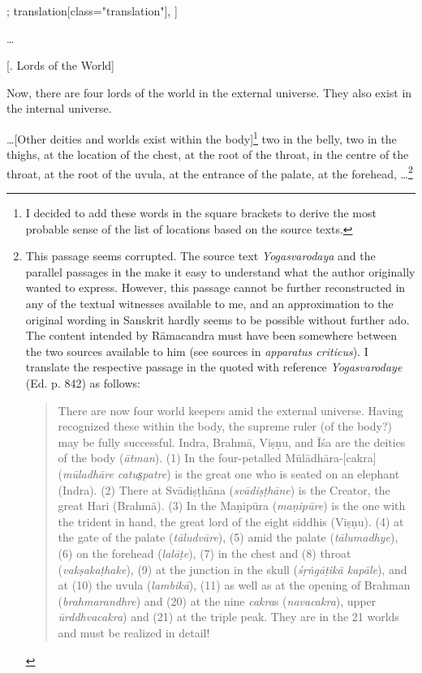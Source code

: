 \begin{alignment}[
  texts=edition[class="edition"];
  translation[class="translation"],
  ]
\begin{edition}
\begin{prose}
{  }\dd{}
\dd{}\begin{otherlanguage}{english} \ldots \sic*{} \end{otherlanguage}
    \end{prose}
  \end{edition}
  \begin{translation}
    \begin{tlate}
      \centerline{\textrm{\small{[. Lords of the World]}}}
      \bigskip
      \noindent

     Now, there are four lords of the world in the external universe. They also exist in the internal universe.

\sic*{} \ldots  [Other deities and worlds exist within the body]\footnote{I decided to add these words in the square brackets to derive the most probable sense of the list of locations based on the source texts.} two in the belly, two in the thighs, at the location of the chest, at the root of the throat, in the centre of the throat, at the root of the uvula, at the entrance of the palate, at the forehead, \ldots \sic*{}\footnote{This passage seems corrupted. The source text \textit{Yogasvarodaya} and the parallel passages in the  make it easy to understand what the author originally wanted to express. However, this passage cannot be further reconstructed in any of the textual witnesses available to me, and an approximation to the original wording in Sanskrit hardly seems to be possible without further ado. The content intended by Rāmacandra must have been somewhere between the two sources available to him (see sources in \textit{apparatus criticus}). I translate the respective passage in the  quoted with reference \textit{Yogasvarodaye} (Ed. p. 842) as follows:
  \begin{quote}
  There are now four world keepers amid the external universe. Having recognized these within the body, the supreme ruler (of the body?) may be fully successful. Indra, Brahmā, Viṣṇu, and Īśa are the deities of the body (\textit{ātman}). (1) In the four-petalled Mūlādhāra-[cakra] (\textit{mūladhāre catus̤patre}) is the great one who is seated on an elephant (Indra). (2) There at Svādiṣṭhāna (\textit{svādiṣṭhāne}) is the Creator, the great Hari (Brahmā). (3) In the Maṇipūra (\textit{maṇipūre}) is the one with the trident in hand, the great lord of the eight siddhis (Viṣṇu). (4) at the gate of the palate (\textit{tāludvāre}), (5) amid the palate (\textit{tālumadhye}), (6) on the forehead (\textit{lalāṭe}), (7) in the chest and (8) throat (\textit{vakṣakaṭhake}), (9) at the junction in the skull (\textit{śṛṅgāṭikā kapāle}), and at (10) the uvula (\textit{lambikā}), (11) as well as at the opening of Brahman (\textit{brahmarandhre}) and (20) at the nine \textit{cakra}s (\textit{navacakra}), upper \textit{ūrddhvacakra}) and (21) at the triple peak. They are in the 21 worlds and must be realized in detail!\end{quote}
}
\end{tlate}
\end{translation}
\end{alignment}
